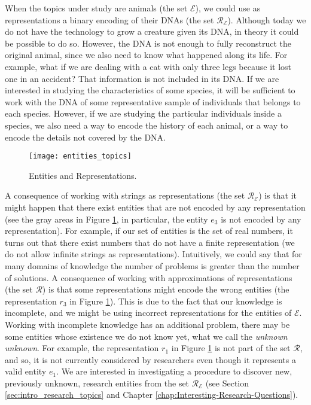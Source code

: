 \begin{example}
\label{ex:animals_DNA}
When the topics under study are animals (the set $\mathcal{E}$), we could use as representations a binary encoding of their DNAs (the set $\mathcal{R_\mathcal{E}}$). Although today we do not have the technology to grow a creature given its DNA, in theory it could be possible to do so. However, the DNA is not enough to fully reconstruct the original animal, since we also need to know what happened along its life. For example, what if we are dealing with a cat with only three legs because it lost one in an accident? That information is not included in its DNA. If we are interested in studying the characteristics of some species, it will be sufficient to work with the DNA of some representative sample of individuals that belongs to each species. However, if we are studying the particular individuals inside a species, we also need a way to encode the history of each animal, or a way to encode the details not covered by the DNA.
\end{example}

\begin{figure}[h]
\centering\texttt{[image: entities\_topics]}
\caption{\label{fig:entities_topics}Entities and Representations.}
\end{figure}

A consequence of working with strings as representations (the set $\mathcal{R}_\mathcal{E}$) is that it might happen that there exist entities that are not encoded by any representation (see the gray areas in Figure \ref{fig:entities_topics}, in particular, the entity $e_3$ is not encoded by any representation). For example, if our set of entities is the set of real numbers, it turns out that there exist numbers that do not have a finite representation (we do not allow infinite strings as representations). Intuitively, we could say that for many domains of knowledge the number of problems is greater than the number of solutions. A consequence of working with approximations of representations (the set $\mathcal{R}$) is that some representations might encode the wrong entities (the representation $r_3$ in Figure \ref{fig:entities_topics}). This is due to the fact that our knowledge is incomplete, and we might be using incorrect representations for the entities of $\mathcal{E}$. Working with incomplete knowledge has an additional problem, there may be some entities whose existence we do not know yet, what we call the \emph{unknown unknown}. For example, the representation $r_1$ in Figure \ref{fig:entities_topics} is not part of the set $\mathcal{R}$, and so, it is not currently considered by researchers even though it represents a valid entity $e_1$. We are interested in investigating a procedure to discover new, previously unknown, research entities from the set $\mathcal{R}_\mathcal{E}$ (see Section \ref{sec:intro_research_topics} and Chapter \ref{chap:Interesting-Research-Questions}).

